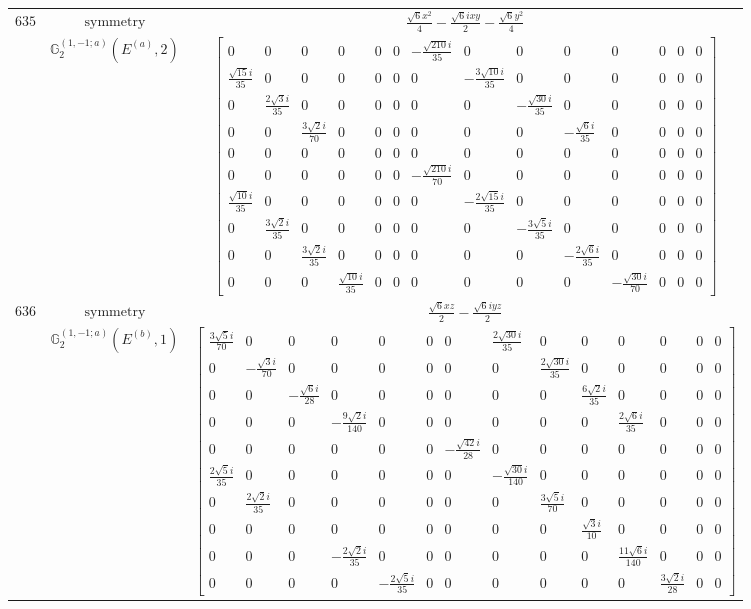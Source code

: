 \documentclass[fleqn,8pt,landscape]{jsarticle}
\begin{document}
\begin{longtable}{ccc}
$ 635 $ & $ \text{symmetry} $ & $ \frac{\sqrt{6} x^{2}}{4} - \frac{\sqrt{6} i x y}{2} - \frac{\sqrt{6} y^{2}}{4} $ \\
$  $ & $ \mathbb{G}_{2}^{(1,-1;a)}(E^{(a)},2) $ & $ \begin{bmatrix} 0 & 0 & 0 & 0 & 0 & 0 & - \frac{\sqrt{210} i}{35} & 0 & 0 & 0 & 0 & 0 & 0 & 0 \\ \frac{\sqrt{15} i}{35} & 0 & 0 & 0 & 0 & 0 & 0 & - \frac{3 \sqrt{10} i}{35} & 0 & 0 & 0 & 0 & 0 & 0 \\ 0 & \frac{2 \sqrt{3} i}{35} & 0 & 0 & 0 & 0 & 0 & 0 & - \frac{\sqrt{30} i}{35} & 0 & 0 & 0 & 0 & 0 \\ 0 & 0 & \frac{3 \sqrt{2} i}{70} & 0 & 0 & 0 & 0 & 0 & 0 & - \frac{\sqrt{6} i}{35} & 0 & 0 & 0 & 0 \\ 0 & 0 & 0 & 0 & 0 & 0 & 0 & 0 & 0 & 0 & 0 & 0 & 0 & 0 \\ 0 & 0 & 0 & 0 & 0 & 0 & - \frac{\sqrt{210} i}{70} & 0 & 0 & 0 & 0 & 0 & 0 & 0 \\ \frac{\sqrt{10} i}{35} & 0 & 0 & 0 & 0 & 0 & 0 & - \frac{2 \sqrt{15} i}{35} & 0 & 0 & 0 & 0 & 0 & 0 \\ 0 & \frac{3 \sqrt{2} i}{35} & 0 & 0 & 0 & 0 & 0 & 0 & - \frac{3 \sqrt{5} i}{35} & 0 & 0 & 0 & 0 & 0 \\ 0 & 0 & \frac{3 \sqrt{2} i}{35} & 0 & 0 & 0 & 0 & 0 & 0 & - \frac{2 \sqrt{6} i}{35} & 0 & 0 & 0 & 0 \\ 0 & 0 & 0 & \frac{\sqrt{10} i}{35} & 0 & 0 & 0 & 0 & 0 & 0 & - \frac{\sqrt{30} i}{70} & 0 & 0 & 0 \end{bmatrix} $ \\ \hline
$ 636 $ & $ \text{symmetry} $ & $ \frac{\sqrt{6} x z}{2} - \frac{\sqrt{6} i y z}{2} $ \\
$  $ & $ \mathbb{G}_{2}^{(1,-1;a)}(E^{(b)},1) $ & $ \begin{bmatrix} \frac{3 \sqrt{5} i}{70} & 0 & 0 & 0 & 0 & 0 & 0 & \frac{2 \sqrt{30} i}{35} & 0 & 0 & 0 & 0 & 0 & 0 \\ 0 & - \frac{\sqrt{3} i}{70} & 0 & 0 & 0 & 0 & 0 & 0 & \frac{2 \sqrt{30} i}{35} & 0 & 0 & 0 & 0 & 0 \\ 0 & 0 & - \frac{\sqrt{6} i}{28} & 0 & 0 & 0 & 0 & 0 & 0 & \frac{6 \sqrt{2} i}{35} & 0 & 0 & 0 & 0 \\ 0 & 0 & 0 & - \frac{9 \sqrt{2} i}{140} & 0 & 0 & 0 & 0 & 0 & 0 & \frac{2 \sqrt{6} i}{35} & 0 & 0 & 0 \\ 0 & 0 & 0 & 0 & 0 & 0 & - \frac{\sqrt{42} i}{28} & 0 & 0 & 0 & 0 & 0 & 0 & 0 \\ \frac{2 \sqrt{5} i}{35} & 0 & 0 & 0 & 0 & 0 & 0 & - \frac{\sqrt{30} i}{140} & 0 & 0 & 0 & 0 & 0 & 0 \\ 0 & \frac{2 \sqrt{2} i}{35} & 0 & 0 & 0 & 0 & 0 & 0 & \frac{3 \sqrt{5} i}{70} & 0 & 0 & 0 & 0 & 0 \\ 0 & 0 & 0 & 0 & 0 & 0 & 0 & 0 & 0 & \frac{\sqrt{3} i}{10} & 0 & 0 & 0 & 0 \\ 0 & 0 & 0 & - \frac{2 \sqrt{2} i}{35} & 0 & 0 & 0 & 0 & 0 & 0 & \frac{11 \sqrt{6} i}{140} & 0 & 0 & 0 \\ 0 & 0 & 0 & 0 & - \frac{2 \sqrt{5} i}{35} & 0 & 0 & 0 & 0 & 0 & 0 & \frac{3 \sqrt{2} i}{28} & 0 & 0 \end{bmatrix} $ \\ \hline

\end{longtable}
\end{document}
